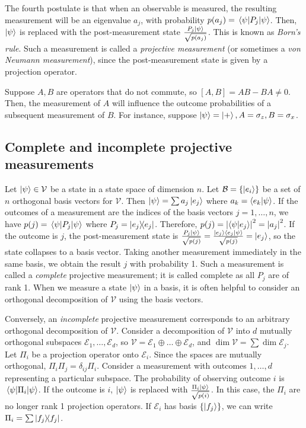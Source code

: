 The fourth postulate is that when an observable is measured, the resulting measurement will be an eigenvalue \( a_j \), with probability \( p(a_j) = \ev{P_j}{\psi} \).
Then, \( \ket{\psi} \) is replaced with the post-measurement state \( \frac{P_j \ket{\psi}}{\sqrt{p(a_j)}} \).
This is known as \emph{Born's rule}.
Such a measurement is called a \emph{projective measurement} (or sometimes a \emph{von Neumann measurement}), since the post-measurement state is given by a projection operator.

Suppose \( A, B \) are operators that do not commute, so \( [A,B] = AB - BA \neq 0 \).
Then, the measurement of \( A \) will influence the outcome probabilities of a subsequent measurement of \( B \).
For instance, suppose \( \ket{\psi} = \ket{+}, A = \sigma_z, B = \sigma_x \).

\subsection{Complete and incomplete projective measurements}
Let \( \ket{\psi} \in \mathcal V \) be a state in a state space of dimension \( n \).
Let \( \mathcal B = \qty{\ket{e_i}} \) be a set of \( n \) orthogonal basis vectors for \( \mathcal V \).
Then \( \ket{\psi} = \sum a_j \ket{e_j} \) where \( a_k = \ip{e_k}{\psi} \).
If the outcomes of a measurement are the indices of the basis vectors \( j = 1, \dots, n \), we have \( p(j) = \ev{P_j}{\psi} \) where \( P_j = \op{e_j}{e_j} \).
Therefore, \( p(j) = \abs{\ip{\psi}{e_j}}^2 = \abs{a_j}^2 \).
If the outcome is \( j \), the post-measurement state is \( \frac{P_j \ket{\psi}}{\sqrt{p(j)}} = \frac{\ket{e_j} \ip{e_j}{\psi}}{\sqrt{p(j)}} = \ket{e_j} \), so the state collapses to a basis vector.
Taking another measurement immediately in the same basis, we obtain the result \( j \) with probability 1.
Such a measurement is called a \emph{complete} projective measurement; it is called complete as all \( P_j \) are of rank 1.
When we measure a state \( \ket{\psi} \) in a basis, it is often helpful to consider an orthogonal decomposition of \( \mathcal V \) using the basis vectors.

Conversely, an \emph{incomplete} projective measurement corresponds to an arbitrary orthogonal decomposition of \( \mathcal V \).
Consider a decomposition of \( \mathcal V \) into \( d \) mutually orthogonal subspaces \( \mathcal E_1, \dots, \mathcal E_d \), so \( \mathcal V = \mathcal E_1 \oplus \dots \oplus \mathcal E_d \), and \( \dim \mathcal V = \sum \dim \mathcal E_j \).
Let \( \Pi_i \) be a projection operator onto \( \mathcal E_i \).
Since the spaces are mutually orthogonal, \( \Pi_i \Pi_j = \delta_{ij} \Pi_i \).
Consider a measurement with outcomes \( 1, \dots, d \) representing a particular subspace.
The probability of observing outcome \( i \) is \( \ev{\Pi_i}{\psi} \).
If the outcome is \( i \), \( \ket{\psi} \) is replaced with \( \frac{\Pi_i \ket{\psi}}{\sqrt{p(i)}} \).
In this case, the \( \Pi_i \) are no longer rank 1 projection operators.
If \( \mathcal E_i \) has basis \( \qty{\ket{f_j}} \), we can write \( \Pi_i = \sum \op{f_j}{f_j} \).

